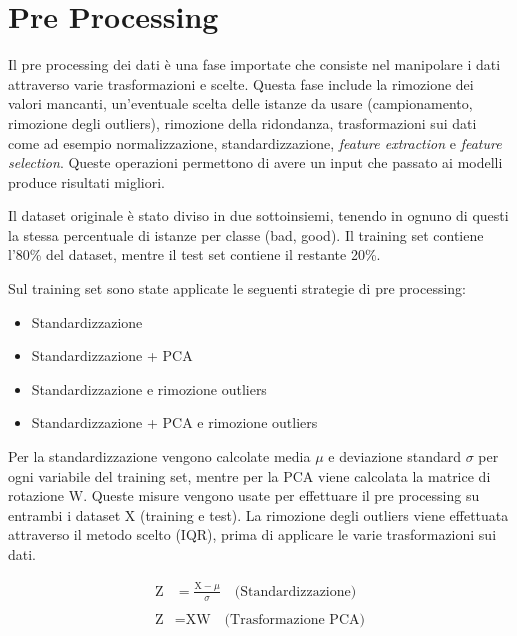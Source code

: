 \chapter{Pre Processing}
\label{ch:preprocessing}
Il pre processing dei dati è una fase importate che consiste nel manipolare i dati attraverso varie trasformazioni e scelte.
Questa fase include la rimozione dei valori mancanti, un'eventuale scelta delle istanze da usare (campionamento, rimozione degli outliers), rimozione della ridondanza, trasformazioni sui dati come ad esempio normalizzazione, standardizzazione, \textit{feature extraction} e \textit{feature selection}.
Queste operazioni permettono di avere un input che passato ai modelli produce  risultati migliori.

\vspace{4mm}
\noindent
Il dataset originale è stato diviso in due sottoinsiemi, tenendo in ognuno di questi la stessa percentuale di istanze per classe (bad, good). Il training set contiene l'80\% del dataset, mentre il test set contiene il restante 20\%.

\vspace{4mm}
\noindent
Sul training set sono state applicate le seguenti strategie di pre processing:

\begin{itemize}
    \item Standardizzazione
    \item Standardizzazione + PCA
    \item Standardizzazione e rimozione outliers
    \item Standardizzazione + PCA e rimozione outliers
\end{itemize}

\newpage

\noindent
Per la standardizzazione vengono calcolate media $\mu$ e deviazione standard $\sigma$ per ogni variabile del training set, mentre per la PCA viene calcolata la matrice di rotazione $\text{W}$.
Queste misure vengono usate per effettuare il pre processing su entrambi i dataset $\text{X}$ (training e test).
La rimozione degli outliers viene effettuata attraverso il metodo scelto (IQR), prima di applicare le varie trasformazioni sui dati.

\vspace{4mm}
\begin{align*}
    \text{Z} &= \frac{\text{X} - \mu}{\sigma} \quad \text{(Standardizzazione)}
    \\\\
    \text{Z} &= \text{X} \text{W} \quad \text{(Trasformazione PCA)}
\end{align*}

